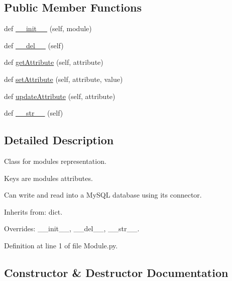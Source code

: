 \subsection*{Public Member Functions}
\begin{DoxyCompactItemize}
\item 
def \mbox{\hyperlink{classwindshape_1_1fansarray_1_1_module_1_1_module_a6c735b3b25967593b946c8d474774eb8}{\+\_\+\+\_\+init\+\_\+\+\_\+}} (self, module)
\item 
def \mbox{\hyperlink{classwindshape_1_1fansarray_1_1_module_1_1_module_a54b00b3e420f945e1b721ec459fb048c}{\+\_\+\+\_\+del\+\_\+\+\_\+}} (self)
\item 
def \mbox{\hyperlink{classwindshape_1_1fansarray_1_1_module_1_1_module_aeb9aa0fcb58caa7d8898f741289d8e8f}{get\+Attribute}} (self, attribute)
\item 
def \mbox{\hyperlink{classwindshape_1_1fansarray_1_1_module_1_1_module_adf9ff452b648c56bc4d3983bd88759e9}{set\+Attribute}} (self, attribute, value)
\item 
def \mbox{\hyperlink{classwindshape_1_1fansarray_1_1_module_1_1_module_abe9124728d6647413c921324f659780b}{update\+Attribute}} (self, attribute)
\item 
def \mbox{\hyperlink{classwindshape_1_1fansarray_1_1_module_1_1_module_a2c405195452cf0f3249a4f939df9ab2e}{\+\_\+\+\_\+str\+\_\+\+\_\+}} (self)
\end{DoxyCompactItemize}


\subsection{Detailed Description}
\begin{DoxyVerb}Class for modules representation.

Keys are modules attributes.

Can write and read into a MySQL database using its connector.

Inherits from: dict.

Overrides: __init__, __del__, __str__.
\end{DoxyVerb}
 

Definition at line 1 of file Module.\+py.



\subsection{Constructor \& Destructor Documentation}
\mbox{\label{classwindshape_1_1fansarray_1_1_module_1_1_module_a6c735b3b25967593b946c8d474774eb8}} 
